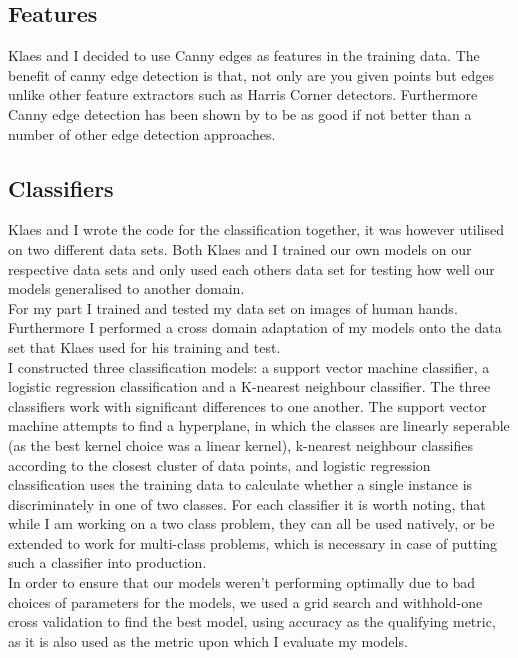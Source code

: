 \documentclass[11pt, a4paper]{article}
\begin{document}
\subsection{Features}
Klaes and I decided to use Canny edges as features in the training data. The benefit of canny edge detection is that, not only are you given points but edges unlike other feature extractors such as Harris Corner detectors. Furthermore Canny edge detection has been shown by  to be as good if not better than a number of other edge detection approaches.\\
\subsection{Classifiers}
Klaes and I wrote the code for the classification together, it was however utilised on two different data sets. Both Klaes and I trained our own models on our respective data sets and only used each others data set for testing how well our models generalised to another domain.\\
For my part I trained and tested my data set on images of human hands. Furthermore I performed a cross domain adaptation of my models onto the data set that Klaes used for his training and test.\\

I constructed three classification models: a support vector machine classifier, a logistic regression classification and a K-nearest neighbour classifier. The three classifiers work with significant differences to one another. The support vector machine attempts to find a hyperplane, in which the classes are linearly seperable (as the best kernel choice was a linear kernel), k-nearest neighbour classifies according to the closest cluster of data points, and logistic regression classification uses the training data to calculate whether a single instance is discriminately in one of two classes. For each classifier it is worth noting, that while I am working on a two class problem, they can all be used natively, or be extended to work for multi-class problems, which is necessary in case of putting such a classifier into production.\\
In order to ensure that our models weren't performing optimally due to bad choices of parameters for the models, we used a grid search and withhold-one cross validation to find the best model, using accuracy as the qualifying metric, as it is also used as the metric upon which I evaluate my models.\\
\end{document}
